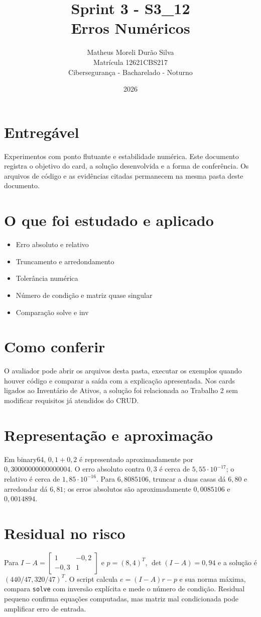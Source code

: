 \documentclass[12pt]{article}
\title{Sprint 3 - S3\_12\\Erros Numéricos}
\author{Matheus Moreli Durão Silva\\Matrícula 12621CBS217\\Cibersegurança - Bacharelado - Noturno}
\date{2026}
\begin{document}
\maketitle

\section*{Entregável}
Experimentos com ponto flutuante e estabilidade numérica. Este documento registra o objetivo do card, a solução desenvolvida e a forma de conferência. Os arquivos de código e as evidências citadas permanecem na mesma pasta deste documento.

\section*{O que foi estudado e aplicado}
\begin{itemize}
\item Erro absoluto e relativo
\item Truncamento e arredondamento
\item Tolerância numérica
\item Número de condição e matriz quase singular
\item Comparação solve e inv
\end{itemize}

\section*{Como conferir}
O avaliador pode abrir os arquivos desta pasta, executar os exemplos quando houver código e comparar a saída com a explicação apresentada. Nos cards ligados ao Inventário de Ativos, a solução foi relacionada ao Trabalho 2 sem modificar requisitos já atendidos do CRUD.

\section*{Representação e aproximação}
Em binary64, $0,1+0,2$ é representado aproximadamente por $0,30000000000000004$. O erro absoluto contra $0,3$ é cerca de $5,55\cdot10^{-17}$; o relativo é cerca de $1,85\cdot10^{-16}$. Para $6,8085106$, truncar a duas casas dá $6,80$ e arredondar dá $6,81$; os erros absolutos são aproximadamente $0,0085106$ e $0,0014894$.
\section*{Residual no risco}
Para $I-A=\left[\begin{smallmatrix}1&-0,2\\-0,3&1\end{smallmatrix}\right]$ e $p=(8,4)^T$, $\det(I-A)=0,94$ e a solução é $(440/47,320/47)^T$. O script calcula $e=(I-A)r-p$ e sua norma máxima, compara \texttt{solve} com inversão explícita e mede o número de condição. Residual pequeno confirma equações computadas, mas matriz mal condicionada pode amplificar erro de entrada.
\end{document}
